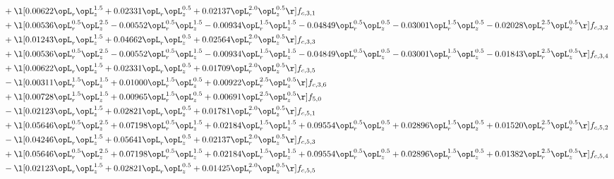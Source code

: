 \begin{alignat}{2}
& + \l[  0.00622 \opL_r \opL_z^{1.5} +  0.02331 \opL_r \opL_z^{0.5} +  0.02137 \opL_r^{2.0} \opL_z^{0.5}  \r] f_{c,3,1} \nonumber \\ 
& + \l[  0.00536 \opL_r^{0.5} \opL_z^{2.5}   -0.00552 \opL_r^{0.5} \opL_z^{1.5}   -0.00934 \opL_r^{1.5} \opL_z^{1.5}   -0.04849 \opL_r^{0.5} \opL_z^{0.5}   -0.03001 \opL_r^{1.5} \opL_z^{0.5}   -0.02028 \opL_r^{2.5} \opL_z^{0.5}  \r] f_{c,3,2} \nonumber \\ 
& + \l[  0.01243 \opL_r \opL_z^{1.5} +  0.04662 \opL_r \opL_z^{0.5} +  0.02564 \opL_r^{2.0} \opL_z^{0.5}  \r] f_{c,3,3} \nonumber \\ 
& + \l[  0.00536 \opL_r^{0.5} \opL_z^{2.5}   -0.00552 \opL_r^{0.5} \opL_z^{1.5}   -0.00934 \opL_r^{1.5} \opL_z^{1.5}   -0.04849 \opL_r^{0.5} \opL_z^{0.5}   -0.03001 \opL_r^{1.5} \opL_z^{0.5}   -0.01843 \opL_r^{2.5} \opL_z^{0.5}  \r] f_{c,3,4} \nonumber \\ 
& + \l[  0.00622 \opL_r \opL_z^{1.5} +  0.02331 \opL_r \opL_z^{0.5} +  0.01709 \opL_r^{2.0} \opL_z^{0.5}  \r] f_{c,3,5} \nonumber \\ 
& - \l[  0.00311 \opL_r^{1.5} \opL_z^{1.5} +  0.01000 \opL_r^{1.5} \opL_z^{0.5} +  0.00922 \opL_r^{2.5} \opL_z^{0.5}  \r] f_{c,3,6} \nonumber \\ 
& + \l[  0.00728 \opL_r^{1.5} \opL_z^{1.5} +  0.00965 \opL_r^{1.5} \opL_z^{0.5} +  0.00691 \opL_r^{2.5} \opL_z^{0.5}  \r] f_{5,0} \nonumber \\ 
& - \l[  0.02123 \opL_r \opL_z^{1.5} +  0.02821 \opL_r \opL_z^{0.5} +  0.01781 \opL_r^{2.0} \opL_z^{0.5}  \r] f_{c,5,1} \nonumber \\ 
& + \l[  0.05646 \opL_r^{0.5} \opL_z^{2.5} +  0.07198 \opL_r^{0.5} \opL_z^{1.5} +  0.02184 \opL_r^{1.5} \opL_z^{1.5} +  0.09554 \opL_r^{0.5} \opL_z^{0.5} +  0.02896 \opL_r^{1.5} \opL_z^{0.5} +  0.01520 \opL_r^{2.5} \opL_z^{0.5}  \r] f_{c,5,2} \nonumber \\ 
& - \l[  0.04246 \opL_r \opL_z^{1.5} +  0.05641 \opL_r \opL_z^{0.5} +  0.02137 \opL_r^{2.0} \opL_z^{0.5}  \r] f_{c,5,3} \nonumber \\ 
& + \l[  0.05646 \opL_r^{0.5} \opL_z^{2.5} +  0.07198 \opL_r^{0.5} \opL_z^{1.5} +  0.02184 \opL_r^{1.5} \opL_z^{1.5} +  0.09554 \opL_r^{0.5} \opL_z^{0.5} +  0.02896 \opL_r^{1.5} \opL_z^{0.5} +  0.01382 \opL_r^{2.5} \opL_z^{0.5}  \r] f_{c,5,4} \nonumber \\ 
& - \l[  0.02123 \opL_r \opL_z^{1.5} +  0.02821 \opL_r \opL_z^{0.5} +  0.01425 \opL_r^{2.0} \opL_z^{0.5}  \r] f_{c,5,5} \nonumber \\ 

\end{alignat}
